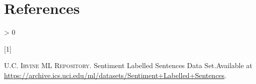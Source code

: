\documentclass[
]{article}
\newlength{\cslhangindent}
\newlength{\csllabelwidth}
\newenvironment{CSLReferences}[3] %
 {%
  \setlength{\parindent}{0pt}
  \ifodd #1 \everypar{\setlength{\hangindent}{\cslhangindent}}\ignorespaces\fi
  \ifnum #2 > 0
  \setlength{\parskip}{#3\baselineskip}
  \fi
 }%
 {}
\newcommand{\CSLLeftMargin}[1]{\parbox[t]{\maxof{\widthof{#1}}{\csllabelwidth}}{#1}}
\newcommand{\CSLRightInline}[1]{\parbox[t]{\linewidth}{#1}}
\begin{document}
\hypertarget{bibliography}{%
\section*{References}\label{bibliography}}

\hypertarget{refs}{}
\begin{CSLReferences}{0}{0}
\leavevmode\hypertarget{ref-sentences}{}%
\CSLLeftMargin{{[}1{]} }
\CSLRightInline{\textsc{U.C. Irvine ML Repository}. {Sentiment Labelled
Sentences Data Set}.Available at
\url{https://archive.ics.uci.edu/ml/datasets/Sentiment+Labelled+Sentences}.}

\end{CSLReferences}
\end{document}
